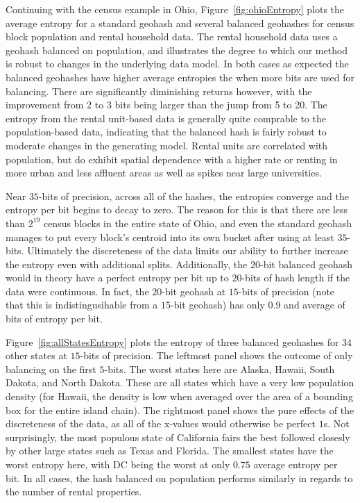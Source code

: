 \documentclass[nips13submit_09,times,art10]{article} %
\begin{document}
Continuing with the census example in Ohio, Figure~\ref{fig:ohioEntropy} plots the average
entropy for a standard geohash and several balanced geohashes for census block population
and rental household data. The rental household data uses a geohash balanced on population,
and illustrates the degree to which our method is robust to changes in the underlying data
model. In both cases as expected the balanced geohashes have higher average entropies the
when more bits are used for balancing. There are significantly diminishing returns however,
with the improvement from 2 to 3 bits being larger than the jump from 5 to 20. The entropy
from the rental unit-based data is generally quite comprable to the population-based data,
indicating that the balanced hash is fairly robust to moderate changes in the generating
model. Rental units are correlated with population, but do exhibit spatial dependence with
a higher rate or renting in more urban and less affluent areas as well as spikes near
large universities.

Near $35$-bits of precision, across all of the hashes, the entropies
converge and the entropy per bit begins to decay to zero. The reason for this is that
there are less than $2^19$ census blocks in the entire state of Ohio, and even the standard
geohash manages to put every block's centroid into its own bucket after using at least
$35$-bits. Ultimately the discreteness of the data limits our ability to further increase
the entropy even with additional splits. Additionally, the $20$-bit balanced geohash would
in theory have a perfect entropy per bit up to $20$-bits of hash length if the data were
continuous. In fact, the $20$-bit geohash at $15$-bits of precision (note that this is
indistingusihable from a $15$-bit geohash) has only $0.9$ and average of bits of entropy
per bit.

Figure~\ref{fig:allStatesEntropy} plots the entropy of three balanced geohashes for
$34$ other states at $15$-bits of precision. The leftmost panel shows the outcome of
only balancing on the first $5$-bits. The worst states here are Alaska, Hawaii, South
Dakota, and North Dakota. These are all states which have a very low population density
(for Hawaii, the density is low when averaged over the area of a bounding box for the
entire island chain). The rightmost panel shows the pure effects
of the discreteness of the data, as all of the x-values would otherwise be perfect $1$s.
Not surprisingly, the most populous state of California fairs the best followed closesly
by other large states such as Texas and Florida. The smallest states have the worst entropy
here, with DC being the worst at only $0.75$ average entropy per bit. In all cases, the
hash balanced on population performs similarly in regards to the number of rental properties.
\end{document}

